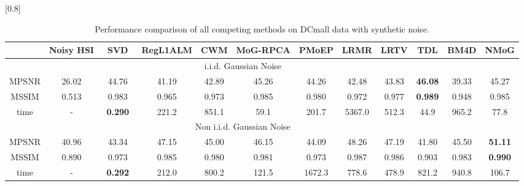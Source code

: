 \documentclass[journal]{IEEEtran}
\begin{document}
\begin{table*}
	\caption{\label{table2} Performance comparison of all competing methods on DCmall data with synthetic noise. }
	\setlength{\tabcolsep}{4pt}
	\begin{center}
		{\small
			\scalebox{0.9}[0.8]{			
				\begin{tabular}{c c c c c c c c c c c c}
						
						\toprule
						& Noisy HSI  & ~SVD~  & RegL1ALM & CWM & MoG-RPCA	& PMoEP & LRMR & LRTV &TDL & BM4D & NMoG\\
						\midrule
						\multicolumn{11}{c}{i.i.d. Gaussian Noise}\\ \hline
						
						MPSNR & 26.02  & 44.76  & 41.19 & 42.89   & 45.26 & 44.26 & 42.48   & 43.83 & \bf{46.08}  & 39.33 & 45.27\\
						MSSIM &  0.513  & 0.983 & 0.965  & 0.973 & 0.985 &  0.980 & 0.972  & 0.977   & {\bf{0.989}} &0.948& 0.985 \\
						time & 	- & \bf{0.290}  & 221.2 & 851.1	& 59.1	& 201.7	& 5367.0 & 512.3 & 44.9	& 965.2   & 77.8  \\  \hline
						
						\multicolumn{11}{c}{Non i.i.d. Gaussian Noise}\\ \hline						
						MPSNR & 40.96  & 43.34  & 47.15 & 45.00  & 46.15 & 44.09 & 48.26  & 47.19 & 41.80  & 45.50 & {\bf{51.11}}\\
						MSSIM & 0.890  & 0.973  & 0.985 & 0.980 & 0.981 &  0.973 &0.987 & 0.986 & 0.903 &0.983 & {\bf{0.990}} \\
						time & 	- & \bf{0.292} 	& 212.0 &800.2	& 121.5	& 1672.3	& 778.6	& 478.9 & 821.2	& 940.8  & 106.7 \\
						

\end{tabular}}}
\end{center}
\end{table*}
\end{document}
